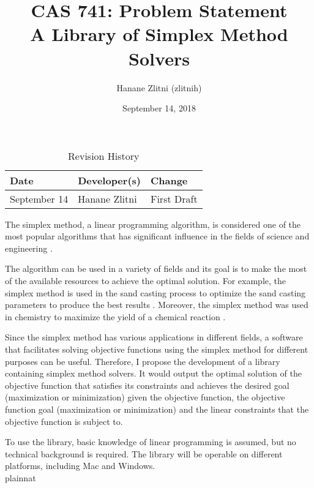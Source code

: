 \documentclass{article}
\title{CAS 741: Problem Statement\\A Library of Simplex Method Solvers}
\author{Hanane Zlitni (zlitnih)}
\date{September 14, 2018}
\begin{document}
\maketitle

\begin{table}[hp]
\caption{Revision History} \label{TblRevisionHistory}
\begin{tabularx}{\textwidth}{llX}
\toprule
\textbf{Date} & \textbf{Developer(s)} & \textbf{Change}\\
\midrule
September 14 & Hanane Zlitni & First Draft\\
\bottomrule
\end{tabularx}
\end{table}

The simplex method, a linear programming algorithm, is considered one of the most popular algorithms that has significant influence in the fields of science and engineering \cite{simplex-popularity}. \par 

The algorithm can be used in a variety of fields and its goal is to make the most of the available resources to achieve the optimal solution. For example, the simplex method is used in the sand casting process to optimize the sand casting parameters to produce the best results \cite{sand-casting}. Moreover, the simplex method was used in chemistry to maximize the yield of a chemical reaction \cite{chemistry}. \par

Since the simplex method has various applications in different fields, a software that facilitates solving objective functions using the simplex method for different purposes can be useful. Therefore, I propose the development of a library containing simplex method solvers. It would output the optimal solution of the objective function that satisfies its constraints and achieves the desired goal (maximization or minimization) given the objective function, the objective function goal (maximization or minimization) and the linear constraints that the objective function is subject to. \par 

To use the library, basic knowledge of linear programming is assumed, but no technical background is required. The library will be operable on different platforms, including Mac and Windows. \\


 {plainnat}

\end{document}
